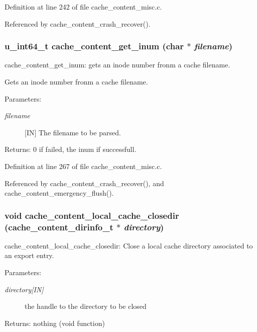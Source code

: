 Definition at line 242 of file cache\_\-content\_\-misc.c.

Referenced by cache\_\-content\_\-crash\_\-recover().
\subsubsection{\setlength{\rightskip}{0pt plus 5cm}u\_\-int64\_\-t cache\_\-content\_\-get\_\-inum (char $\ast$ {\em filename})}\label{cache__content__misc_8c_a6}


cache\_\-content\_\-get\_\-inum: gets an inode number fronm a cache filename.

Gets an inode number fronm a cache filename.

\begin{Desc}
\item[Parameters:]
\begin{description}
\item[{\em filename}][IN] The filename to be parsed.\end{description}
\end{Desc}
\begin{Desc}
\item[Returns:]0 if failed, the inum if successfull. \end{Desc}


Definition at line 267 of file cache\_\-content\_\-misc.c.

Referenced by cache\_\-content\_\-crash\_\-recover(), and cache\_\-content\_\-emergency\_\-flush().
\subsubsection{\setlength{\rightskip}{0pt plus 5cm}void cache\_\-content\_\-local\_\-cache\_\-closedir (cache\_\-content\_\-dirinfo\_\-t $\ast$ {\em directory})}\label{cache__content__misc_8c_a19}


cache\_\-content\_\-local\_\-cache\_\-closedir: Close a local cache directory associated to an export entry.

\begin{Desc}
\item[Parameters:]
\begin{description}
\item[{\em directory\mbox{[}IN\mbox{]}}]the handle to the directory to be closed\end{description}
\end{Desc}
\begin{Desc}
\item[Returns:]nothing (void function) \end{Desc}


